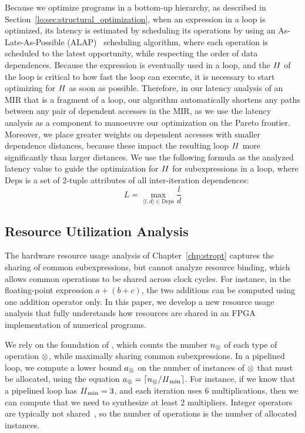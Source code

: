 Because we optimize programs in a bottom-up hierarchy, as described in
Section~\ref{lo:sec:structural_optimization}, when an expression in a loop is
optimized, its latency is estimated by scheduling its operations by using an
As-Late-As-Possible (ALAP)~\cite{wang_hls} scheduling algorithm, where each
operation is scheduled to the latest opportunity, while respecting the order of
data dependences.  Because the expression is eventually used in a loop, and the
$\mathit{II}$ of the loop is critical to how fast the loop can execute, it is necessary
to start optimizing for $\mathit{II}$ as soon as possible. Therefore, in our latency
analysis of an MIR that is a fragment of a loop, our algorithm automatically
shortens any paths between any pair of dependent accesses in the MIR\@, as we
use the latency analysis as a component to manoeuvre our optimization on the
Pareto frontier.  Moreover, we place greater weights on dependent accesses with
smaller dependence distances, because these impact the resulting loop $\mathit{II}$
more significantly than larger distances.  We use the following formula as the
analyzed latency value to guide the optimization for $\mathit{II}$ for subexpressions
in a loop, where $\mathrm{Deps}$ is a set of 2-tuple attributes of all
inter-iteration dependences:
\begin{equation}
    L = \max_{\langle l, d \rangle \in \mathrm{Deps}} \frac{l}{d}
\end{equation}

\subsection{Resource Utilization Analysis}
\label{lo:sub:resource_utilization_analysis}

The hardware resource usage analysis of Chapter~\ref{chp:stropt} captures the
sharing of common subexpressions, but cannot analyze resource binding, which
allows common operations to be shared across clock cycles. For instance, in
the floating-point expression $a + (b + c)$, the two additions can be computed
using one addition operator only. In this paper, we develop a new resource
usage analysis that fully understands how resources are shared in an FPGA
implementation of numerical programs.

We rely on the foundation of \SOAP{}, which counts the number $n_\otimes$
of each type of operation $\otimes$, while maximally sharing common
subexpressions.  In a pipelined loop, we compute a lower bound $a_\otimes$
on the number of instances of $\otimes$ that must be allocated, using
the equation $a_\otimes = \lceil n_\otimes/\mathit{II}_{\rm min}\rceil$.  For instance,
if we know that a pipelined loop has $\mathit{II}_{\rm min} = 3$, and each iteration uses 6
multiplications, then we can compute that we need to synthesize at least 2
multipliers.  Integer operators are typically not shared~\cite{cong15}, so the
number of operations is the number of allocated instances.


